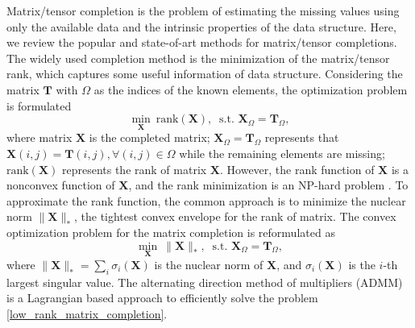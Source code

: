 \documentclass[12pt, draftcls, onecolumn]{IEEEtran}
\theoremstyle{plain}
\theoremstyle{definition}
\theoremstyle{remark}
\newcommand{\nt}[1]{\textcolor{red}{\textbf{[#1]}}}
\begin{document}
Matrix/tensor completion is the problem of estimating the missing values using only the available data and the intrinsic properties of the data structure.
Here, we review the popular and state-of-art methods for matrix/tensor completions.
The widely used completion method is the minimization of the matrix/tensor rank, which captures some useful information of data structure.
Considering the matrix $\mathbf{T}$ with $\Omega$ as the indices of the known elements, the optimization problem is formulated 
\begin{equation}
    \min_{\mathbf{X}}\ \text{rank}(\mathbf{X}),\ \text{ s.t. }\mathbf{X}_{\Omega}=\mathbf{T}_{\Omega},
\end{equation}
where matrix $\mathbf{X}$ is the completed matrix;
$\mathbf{X}_\Omega=\mathbf{T}_\Omega$ represents that $\mathbf{X}(i,j)=\mathbf{T}(i,j),\forall (i,j)\in \Omega$ while the remaining elements are missing;
$\text{rank}(\mathbf{X})$ represents the rank of matrix $\mathbf{X}$.
However, the rank function of $\mathbf{X}$ is a nonconvex function of $\mathbf{X}$, and the rank minimization is an NP-hard problem \cite{Gillis:2011:LMA:2340911.2340913}.
To approximate the rank function, the common approach \cite{Cai_asingular} is to minimize the nuclear norm $\lVert\mathbf{X}\rVert_*$, the tightest convex envelope for the rank of matrix. 
The convex optimization problem  for the matrix completion is reformulated as
\begin{equation}
\label{low_rank_matrix_completion}
    \min_{\mathbf{X}}\ \lVert\mathbf{X}\rVert_*,\ \text{ s.t. }\mathbf{X}_{\Omega}=\mathbf{T}_{\Omega},
\end{equation}
where $\lVert\mathbf{X}\rVert_*=\sum_i \sigma_i(\mathbf{X})$ is the nuclear norm of $\mathbf{X}$, and $\sigma_i(\mathbf{X})$ is the $i$-th largest singular value. %
The alternating direction method of multipliers (ADMM) \cite{Yang_linearizedaugmented} is a Lagrangian based approach to efficiently solve the problem \eqref{low_rank_matrix_completion}. %
\end{document}
